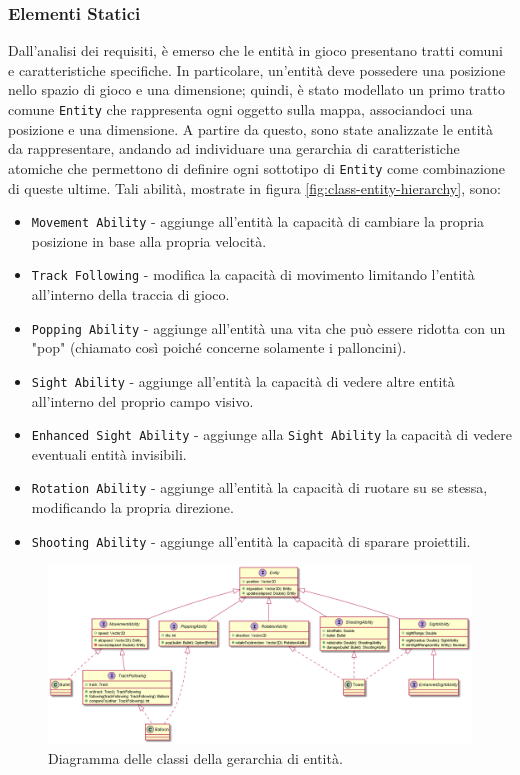 \subsubsection{Elementi Statici}
Dall'analisi dei requisiti, è emerso che le entità in gioco presentano tratti comuni e caratteristiche specifiche. In
particolare, un'entità deve possedere una posizione nello spazio di gioco e una dimensione; quindi, è stato modellato
un primo tratto comune \texttt{Entity} che rappresenta ogni oggetto sulla mappa, associandoci una posizione e una
dimensione. A partire da questo, sono state analizzate le entità da rappresentare, andando ad individuare una gerarchia
di caratteristiche atomiche che permettono di definire ogni sottotipo di \texttt{Entity} come combinazione di queste
ultime. Tali abilità, mostrate in figura \ref{fig:class-entity-hierarchy}, sono:
\begin{itemize}
    \item \texttt{Movement Ability} - aggiunge all'entità la capacità di cambiare la propria posizione in base alla
    propria velocità.
    \item \texttt{Track Following} - modifica la capacità di movimento limitando l'entità all'interno della traccia di
    gioco.
    \item \texttt{Popping Ability} - aggiunge all'entità una vita che può essere ridotta con un "pop" (chiamato così
    poiché concerne solamente i palloncini).
    \item \texttt{Sight Ability} - aggiunge all'entità la capacità di vedere altre entità all'interno del proprio campo
    visivo.
    \item \texttt{Enhanced Sight Ability} - aggiunge alla \texttt{Sight Ability} la capacità di vedere eventuali entità
    invisibili.
    \item \texttt{Rotation Ability} - aggiunge all'entità la capacità di ruotare su se stessa, modificando la propria
    direzione.
    \item \texttt{Shooting Ability} - aggiunge all'entità la capacità di sparare proiettili.
\end{itemize}

\begin{figure}[H]
    \centering
    \includegraphics[width=\linewidth]{img/class-entity-hierarchy-extended}
    \caption{Diagramma delle classi della gerarchia di entità.}
    \label{fig:class-entity-abilities}
\end{figure}

